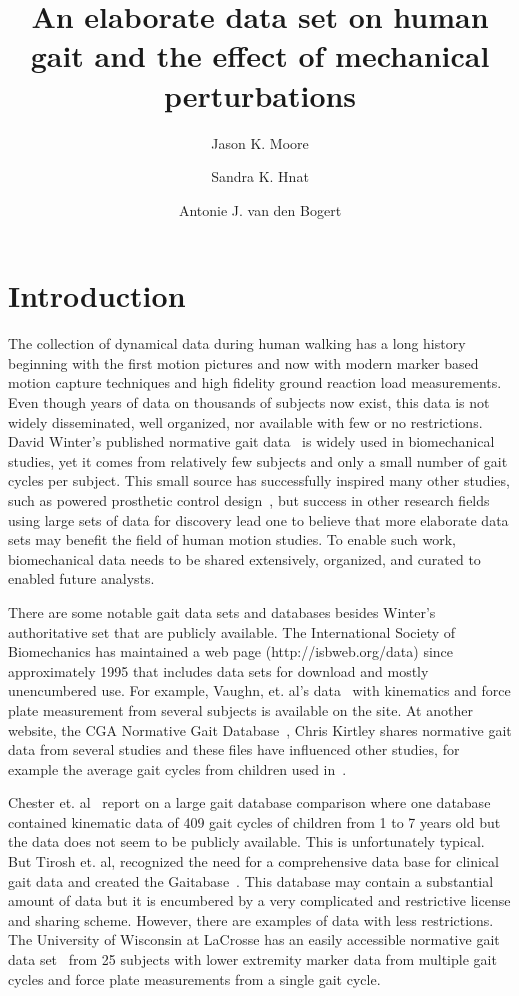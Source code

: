 \documentclass[fleqn,10pt]{wlpeerj}
\title{An elaborate data set on human gait and the effect of mechanical
  perturbations}
\author[1]{Jason K. Moore}
\author[1]{Sandra K. Hnat}
\author[1]{Antonie J. van den Bogert}
\affil[1]{Mechanical Engineering, Cleveland State University, Cleveland, Ohio,
  USA, 44115. j.k.moore19@csuohio.edu, s.hnat@vikes.csuohio.edu,
  a.vandenbogert@csuohio.edu}
\begin{document}
\flushbottom
\maketitle
\thispagestyle{empty}

\section*{Introduction}
%
The collection of dynamical data during human walking has a long history
beginning with the first motion pictures and now with modern marker based
motion capture techniques and high fidelity ground reaction load measurements.
Even though years of data on thousands of subjects now exist, this data is not
widely disseminated, well organized, nor available with few or no restrictions.
David Winter's published normative gait data~\cite{Winter1990} is widely used
in biomechanical studies, yet it comes from relatively few subjects and only a
small number of gait cycles per subject. This small source has successfully
inspired many other studies, such as powered prosthetic control
design~\cite{Sup2008}, but success in other research fields using large sets of
data for discovery lead one to believe that more elaborate data sets may
benefit the field of human motion studies. To enable such work, biomechanical
data needs to be shared extensively, organized, and curated to enabled
future analysts.

There are some notable gait data sets and databases besides Winter's
authoritative set that are publicly available. The International Society of
Biomechanics has maintained a web page (http://isbweb.org/data) since
approximately 1995 that includes data sets for download and mostly unencumbered
use. For example, Vaughn, et. al's data~\cite{Vaughan1992} with kinematics and
force plate measurement from several subjects is available on the site. At
another website, the CGA Normative Gait Database~\cite{Kirtley2014}, Chris
Kirtley shares normative gait data from several studies and these files have
influenced other studies, for example the average gait cycles from children
used in~\cite{Bogert2003}.

Chester et. al~\cite{Chester2007} report on a large gait database comparison
where one database contained kinematic data of 409 gait cycles of children from
1 to 7 years old but the data does not seem to be publicly available. This is
unfortunately typical. But Tirosh et. al, recognized the need for a
comprehensive data base for clinical gait data and created the
Gaitabase~\cite{Tirosh2010}. This database may contain a substantial amount of
data but it is encumbered by a very complicated and restrictive license and
sharing scheme. However, there are examples of data with less restrictions. The
University of Wisconsin at LaCrosse has an easily accessible normative gait
data set~\cite{Wilson2014} from 25 subjects with lower extremity marker data
from multiple gait cycles and force plate measurements from a single gait
cycle.
\end{document}

